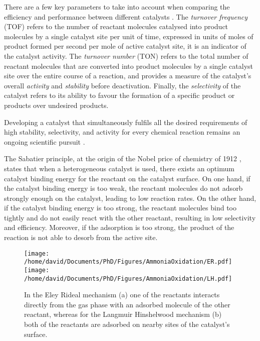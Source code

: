 There are a few key parameters to take into account when comparing the efficiency and performance between different catalysts \parencite{Boudart1995, Zhang2019, Wachs2022}.
The \textit{turnover frequency} (TOF) refers to the number of reactant molecules catalysed into product molecules by a single catalyst site per unit of time, expressed in units of moles of product formed per second per mole of active catalyst site, it is an indicator of the catalyst activity.
The \textit{turnover number} (TON) refers to the total number of reactant molecules that are converted into product molecules by a single catalyst site over the entire course of a reaction, and provides a measure of the catalyst's overall \textit{activity} and \textit{stability} before deactivation.
Finally, the \textit{selectivity} of the catalyst refers to its ability to favour the formation of a specific product or products over undesired products.

Developing a catalyst that simultaneously fulfils all the desired requirements of high stability, selectivity, and activity for every chemical reaction remains an ongoing scientific pursuit \parencite{Hagen2016}.

The Sabatier principle, at the origin of the Nobel price of chemistry of 1912 \parencite{Che2013}, states that when a heterogeneous catalyst is used, there exists an optimum catalyst binding energy for the reactant on the catalyst surface.
On one hand, if the catalyst binding energy is too weak, the reactant molecules do not adsorb strongly enough on the catalyst, leading to low reaction rates.
On the other hand, if the catalyst binding energy is too strong, the reactant molecules bind too tightly and do not easily react with the other reactant, resulting in low selectivity and efficiency.
Moreover, if the adsorption is too strong, the product of the reaction is not able to desorb from the active site.

\begin{figure}[!htb]
    \centering
    \texttt{[image: /home/david/Documents/PhD/Figures/AmmoniaOxidation/ER.pdf]}
    \texttt{[image: /home/david/Documents/PhD/Figures/AmmoniaOxidation/LH.pdf]}
    \caption{
        In the Eley Rideal mechanism (a) one of the reactants interacts directly from the gas phase with an adsorbed molecule of the other reactant, whereas for the Langmuir Hinshelwood mechanism (b) both of the reactants are adsorbed on nearby sites of the catalyst's surface.
    }
    \label{fig:Mechanisms}
\end{figure}

